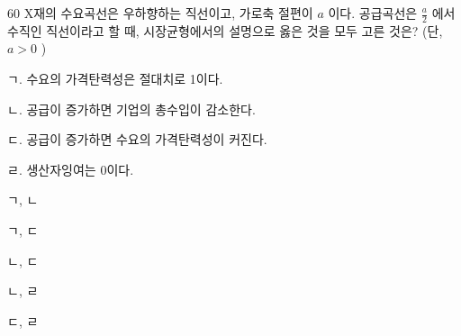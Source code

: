 \begin{question}{60}
X재의 수요곡선은 우하향하는 직선이고, 가로축 절편이 $a$ 이다. 공급곡선은 $\frac{a}{2}$
에서 수직인 직선이라고 할 때, 시장균형에서의 설명으로 옳은 것을 모두 고른 것은? (단, $a>0$ )
\begin{framedtext}
ㄱ. 수요의 가격탄력성은 절대치로 1이다. \par
ㄴ. 공급이 증가하면 기업의 총수입이 감소한다. \par
ㄷ. 공급이 증가하면 수요의 가격탄력성이 커진다. \par
ㄹ. 생산자잉여는 0이다.
\end{framedtext}
\begin{choices}
  \item ㄱ, ㄴ
  \item ㄱ, ㄷ
  \item ㄴ, ㄷ
  \item ㄴ, ㄹ
  \item ㄷ, ㄹ
\end{choices}
\end{question}
